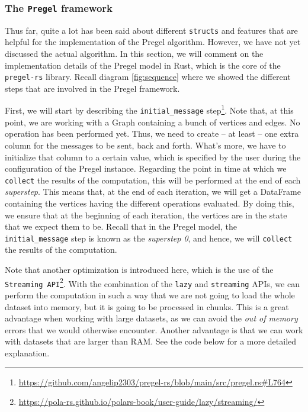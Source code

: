 \begin{code}
    \inputminted{rust}{code/listings/11-1_graph.rs}
\end{code}

\vspace*{1em}

\subsubsection{The \texttt{Pregel} framework}

Thus far, quite a lot has been said about different \texttt{structs} and features that are helpful for the implementation of the Pregel algorithm. However, we have not yet discussed the actual algorithm. In this section, we will comment on the implementation details of the Pregel model in Rust, which is the core of the \texttt{pregel-rs} library. Recall diagram \ref{fig:sequence} where we showed the different steps that are involved in the Pregel framework.

First, we will start by describing the \texttt{initial\_message} step\footnote{\url{https://github.com/angelip2303/pregel-rs/blob/main/src/pregel.rs\#L764}}. Note that, at this point, we are working with a Graph containing a bunch of vertices and edges. No operation has been performed yet. Thus, we need to create -- at least -- one extra column for the messages to be sent, back and forth. What's more, we have to initialize that column to a certain value, which is specified by the user during the configuration of the Pregel instance. Regarding the point in time at which we \texttt{collect} the results of the computation, this will be performed at the end of each \textit{superstep}. This means that, at the end of each iteration, we will get a DataFrame containing the vertices having the different operations evaluated. By doing this, we ensure that at the beginning of each iteration, the vertices are in the state that we expect them to be. Recall that in the Pregel model, the \texttt{initial\_message} step is known as the \textit{superstep 0}, and hence, we will \texttt{collect} the results of the computation.

Note that another optimization is introduced here, which is the use of the \texttt{Streaming API}\footnote{\url{https://pola-rs.github.io/polars-book/user-guide/lazy/streaming/}}. With the combination of the \texttt{lazy} and \texttt{streaming} APIs, we can perform the computation in such a way that we are not going to load the whole dataset into memory, but it is going to be processed in chunks. This is a great advantage when working with large datasets, as we can avoid the \textit{out of memory} errors that we would otherwise encounter. Another advantage is that we can work with datasets that are larger than RAM. See the code below for a more detailed explanation.

